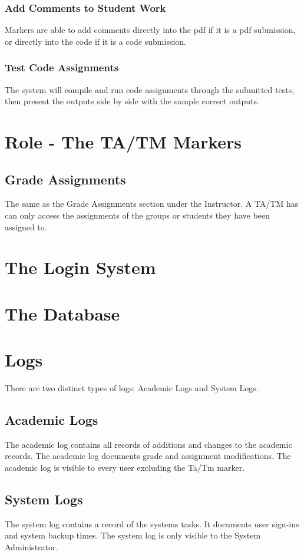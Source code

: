 \documentclass{article}
\begin{document}
\subsubsection{Add Comments to Student Work}
Markers are able to add comments directly into the pdf if it is a pdf submission,
or directly into the code if it is a code submission.
\subsubsection{Test Code Assignments}
The system will compile and run code assignments through the submitted tests,
then present the outputs side by side with the sample correct outputs.

\section{Role - The TA/TM Markers \label{Marker}}
\subsection{Grade Assignments}
The same as the Grade Assignments section under the Instructor.
A TA/TM has can only access the assignments of the groups or students they
have been assigned to.

\section{The Login System}

\section{The Database}

\section{Logs}
There are two distinct types of logs: Academic Logs and System Logs.
\subsection{Academic Logs}
The academic log contains all records of additions and changes to the academic records.
The academic log documents grade and assignment modifications.  The academic log
is visible to every user excluding the Ta/Tm marker.
\subsection{System Logs}
The system log contains a record of the systems tasks.  It documents user sign-ins
and system backup times. The system log is only visible to the System Administrator.
\end{document}
